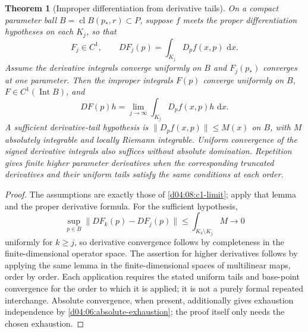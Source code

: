 \documentclass[11pt,oneside,openany]{book}
\newtheorem{theorem}{Theorem}[chapter]
\theoremstyle{definition}
\theoremstyle{remark}
\newcommand{\norm}[1]{\lVert#1\rVert}
\newcommand{\dd}{\,\mathrm d}
\DeclareMathOperator{\Int}{Int}
\DeclareMathOperator{\cl}{cl}
\begin{document}
\begin{theorem}[Improper differentiation from derivative tails]\label{d04:08:improper-derivative}
On a compact parameter ball $B=\cl B(p_*,r)\subset P$, suppose $f$ meets the proper differentiation hypotheses on each $K_j$, so that
\[
 F_j\in C^1,\qquad DF_j(p)=\int_{K_j}D_pf(x,p)\,\dd x.
\]
Assume the derivative integrals converge uniformly on $B$ and $F_j(p_*)$ converges at one parameter. Then the improper integrals $F(p)$ converge uniformly on $B$, $F\in C^1(\Int B)$, and
\[
 DF(p)h=\lim_{j\to\infty}\int_{K_j}D_pf(x,p)h\,\dd x.
\]
A sufficient derivative-tail hypothesis is $\norm{D_pf(x,p)}\leq M(x)$ on $B$, with $M$ absolutely integrable and locally Riemann integrable. Uniform convergence of the signed derivative integrals also suffices without absolute domination. Repetition gives finite higher parameter derivatives when the corresponding truncated derivatives and their uniform tails satisfy the same conditions at each order.
\end{theorem}
\begin{proof}
The assumptions are exactly those of \cref{d04:08:c1-limit}; apply that lemma and the proper derivative formula. For the sufficient hypothesis,
\[
 \sup_{p\in B}\norm{DF_k(p)-DF_j(p)}
 \leq\int_{K_k\setminus K_j}M\longrightarrow0
\]
uniformly for $k\geq j$, so derivative convergence follows by completeness in the finite-dimensional operator space. The assertion for higher derivatives follows by applying the same lemma in the finite-dimensional spaces of multilinear maps, order by order. Each application requires the stated uniform tails and base-point convergence for the order to which it is applied; it is not a purely formal repeated interchange. Absolute convergence, when present, additionally gives exhaustion independence by \cref{d04:06:absolute-exhaustion}; the proof itself only needs the chosen exhaustion.
\end{proof}
\end{document}
